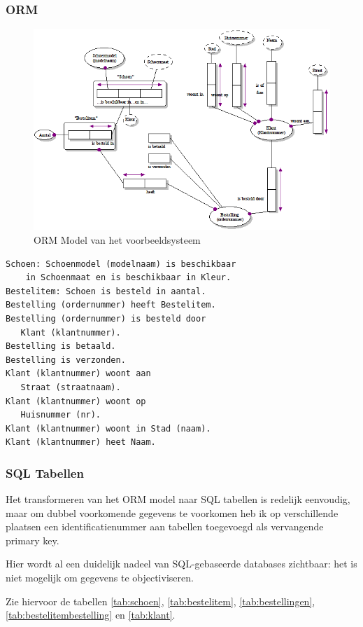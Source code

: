 \documentclass[10pt]{article}
\begin{document}
\subsubsection{ORM}
\begin{figure}[htp]
  \centering
  \includegraphics[keepaspectratio=true, width=345pt]{model1.png}
  \caption{ORM Model van het voorbeeldsysteem}
  \label{img:model1}
\end{figure}

\begin{verbatim}
Schoen: Schoenmodel (modelnaam) is beschikbaar
    in Schoenmaat en is beschikbaar in Kleur.
Bestelitem: Schoen is besteld in aantal.
Bestelling (ordernummer) heeft Bestelitem.
Bestelling (ordernummer) is besteld door 
   Klant (klantnummer).
Bestelling is betaald.
Bestelling is verzonden.
Klant (klantnummer) woont aan 
   Straat (straatnaam).
Klant (klantnummer) woont op 
   Huisnummer (nr).
Klant (klantnummer) woont in Stad (naam).
Klant (klantnummer) heet Naam.
\end{verbatim}

\subsubsection{SQL Tabellen}

Het transformeren van het ORM model naar SQL tabellen is redelijk 
eenvoudig, maar om dubbel voorkomende gegevens te voorkomen heb ik
op verschillende plaatsen een identificatienummer aan tabellen 
toegevoegd als vervangende primary key.

Hier wordt al een duidelijk nadeel van SQL-gebaseerde databases
zichtbaar: het is niet mogelijk om gegevens te objectiviseren.

Zie hiervoor de tabellen \ref{tab:schoen}, \ref{tab:bestelitem},
\ref{tab:bestellingen}, \ref{tab:bestelitembestelling} en \ref{tab:klant}.
\end{document}
